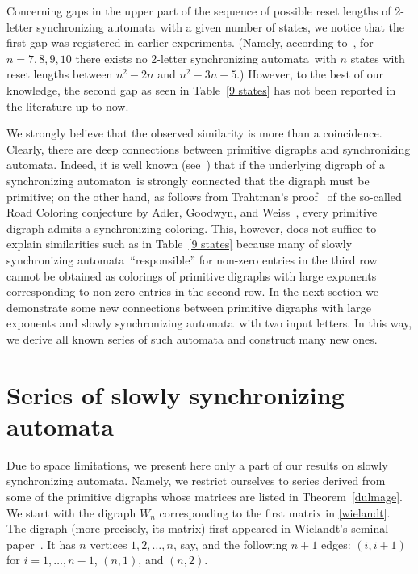 \documentclass[11pt]{llncs}
\newcommand{\sa}{synchronizing automata}
\newcommand{\san}{synchronizing automaton}
\begin{document}
Concerning gaps in the upper part of the sequence of possible reset lengths of
2-letter \sa\ with a given number of states, we notice that the first gap was
registered in earlier experiments. (Namely, according to~\cite{Tr06,Tr06a},
for $n=7,8,9,10$ there exists no 2-letter \sa\ with $n$ states with reset lengths
between $n^2-2n$ and $n^2-3n+5$.) However, to the best of our knowledge, the second
gap as seen in Table~\ref{9 states} has not been reported in the literature up to now.

We strongly believe that the observed similarity is more than a coincidence.
Clearly, there are deep connections between primitive digraphs and \sa. Indeed,
it is well known (see~\cite{AGW}) that if the underlying digraph of a \san\
is strongly connected that the digraph must be primitive; on the other hand,
as follows from Trahtman's proof~\cite{Tr09} of the so-called Road Coloring
conjecture by Adler, Goodwyn, and Weiss~\cite{AGW}, every primitive digraph
admits a synchronizing coloring. This, however, does not suffice to explain
similarities such as in Table~\ref{9 states} because many of slowly \sa\
``responsible'' for non-zero entries in the third row cannot be obtained
as colorings of primitive digraphs with large exponents corresponding
to non-zero entries in the second row. In the next section we demonstrate
some new connections between primitive digraphs with large exponents and
slowly \sa\ with two input letters. In this way, we derive all known
series of such automata and construct many new ones.

\section{Series of slowly \sa}
\label{sss}

Due to space limitations, we present here only a part of our results on slowly \sa.
Namely, we restrict ourselves to series derived from some of the primitive digraphs
whose matrices are listed in Theorem~\ref{dulmage}. We start with the digraph $W_n$
corresponding to the first matrix in \eqref{wielandt}. The digraph (more precisely,
its matrix) first appeared in Wielandt's seminal paper~\cite{Wi50}. It has $n$
vertices $1,2,\dots,n$, say, and the following $n+1$ edges: $(i,i+1)$ for
$i=1,\dots,n-1$, $(n,1)$, and $(n,2)$.
\end{document}
